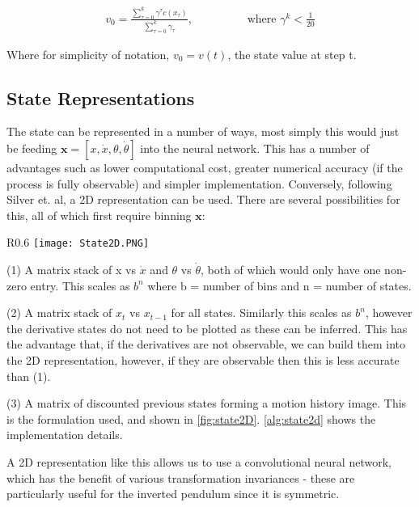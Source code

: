 \documentclass[../main.tex]{subfiles}
\begin{document}
\begin{align}
   v_0 = \frac{\sum_{\tau=0}^{k} \gamma^\tau c(x_\tau ) }{\sum_{\tau = 0}^k \gamma_\tau}, \hspace{2cm} \text{where } \gamma^k < \frac{1}{20}
\end{align}

Where for simplicity of notation, $v_0 = v(t)$, the state value at step t.

\subsection{State Representations}

The state can be represented in a number of ways, most simply this would just be feeding $\boldsymbol{x} = [x, \dot{x}, \theta, \dot{\theta}]$ into the neural network. This has a number of advantages such as lower computational cost, greater numerical accuracy (if the process is fully observable) and simpler implementation. Conversely, following Silver et. al, a 2D representation can be used. There are several possibilities for this, all of which first require binning $\boldsymbol{x}$:

\begin{wrapfigure}{R}{0.6\textwidth}
   \centering
   \texttt{[image: State2D.PNG]}
   \vspace{-20pt}
   \caption{An example of a 2D state representation where there are 20 bins and 17 random actions have been taken.}
   \label{fig:state2D}
\end{wrapfigure}

(1) A matrix stack of x vs $\dot{x}$ and $\theta$ vs $\dot{\theta}$, both of which would only have one non-zero entry. This scales as $b^n$ where b = number of bins and n = number of states.

(2) A matrix stack of $x_t$ vs $x_{t-1}$ for all states. Similarly this scales as $b^n$, however the derivative states do not need to be plotted as these can be inferred. This has the advantage that, if the derivatives are not observable, we can build them into the 2D representation, however, if they are observable then this is less accurate than (1).

(3) A matrix of discounted previous states forming a motion history image. This is the formulation used, and shown in \cref{fig:state2D}. \cref{alg:state2d} shows the implementation details.

A 2D representation like this allows us to use a convolutional neural network, which has the benefit of various transformation invariances - these are particularly useful for the inverted pendulum since it is symmetric.
\end{document}
